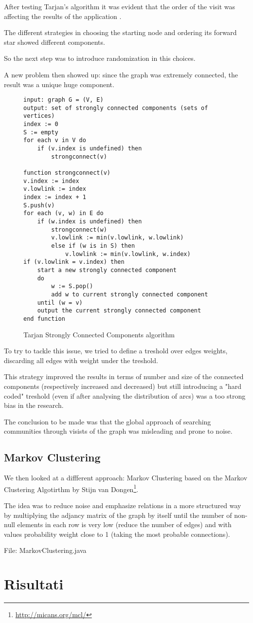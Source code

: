 \documentclass[12pt,a4paper]{article}
\begin{document}
After testing Tarjan's algorithm it was evident that the order of the visit
was affecting the results of the application	.

The different strategies in choosing the starting node and ordering its forward
star showed different components.

So the next step was to introduce randomization in this choices.

A new problem then showed up: since the graph was extremely connected, the result
was a unique huge component.
\begin{figure}
\begin{verbatim}
input: graph G = (V, E)
output: set of strongly connected components (sets of vertices)
index := 0
S := empty
for each v in V do
	if (v.index is undefined) then
		strongconnect(v)
		
function strongconnect(v)
v.index := index
v.lowlink := index
index := index + 1
S.push(v)
for each (v, w) in E do
	if (w.index is undefined) then
		strongconnect(w)
		v.lowlink := min(v.lowlink, w.lowlink)
		else if (w is in S) then
			v.lowlink := min(v.lowlink, w.index)
if (v.lowlink = v.index) then
	start a new strongly connected component
	do
		w := S.pop()
		add w to current strongly connected component
	until (w = v)
	output the current strongly connected component
end function
\end{verbatim}
\caption{Tarjan Strongly Connected Components algorithm}
\label{alg:tarjan}
\end{figure}
To try to tackle this issue, we tried to define a treshold over edges weights, discarding all
edges with weight under the treshold.

This strategy improved the results in terms of number and size of the connected components
(respectively increased and decreased) but still introducing a "hard coded" treshold (even if
after analysing the distribution of arcs) was a too strong bias in the research.

The conclusion to be made was that the global approach of searching communities through visists
of the graph was misleading and prone to noise.

\subsection{Markov Clustering}

We then looked at a diffferent approach: Markov Clustering based on the Markov Clustering Algotirthm by Stijn van Dongen\footnote{\url{http://micans.org/mcl/}}.

The idea was to reduce noise and emphasize relations in a more structured way
by multiplying the adjancy matrix of the graph by itself until the number of
non-null elements in each row is very low (reduce the number of edges) and with
values probability weight close to 1 (taking the most probable connections).

File: MarkovClustering.java



\section{Risultati}
\label{results}
\end{document}
